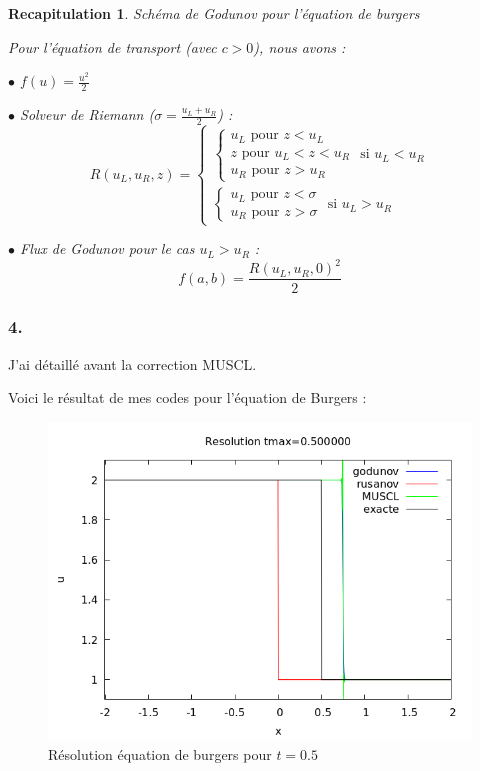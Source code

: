 \documentclass{article}
\newtheorem{recap}{Recapitulation}
\begin{document}
\begin{recap}{Schéma de Godunov pour l'équation de burgers}

Pour l'équation de transport (avec $c>0$), nous avons :

$\bullet$ $f(u) = \frac{u^2}{2}$

$\bullet$ Solveur de Riemann ($\sigma = \frac{u_L+u_R}{2}$) :
\[ R(u_L, u_R, z) = \left\{ \begin{matrix}

	\left\{ \begin{matrix}
		u_L \text{ pour } z < u_L \\
		z \text{ pour } u_L < z < u_R \\
		u_R \text{ pour } z > u_R	
	\end{matrix} \right. \text{ si } u_L < u_R \\	
	
	\left\{ \begin{matrix} 
		u_L \text{ pour } z < \sigma \\
		u_R \text{ pour } z > \sigma
	\end{matrix} \right. \text{ si } u_L > u_R

	\end{matrix} \right. \]

$\bullet$ Flux de Godunov pour le cas $u_L > u_R$ :
\[ f(a,b) = \frac{R(u_L,u_R,0)^2}{2}\]

\end{recap}

\subsubsection*{4.}

J'ai détaillé avant la correction MUSCL.
\newline


Voici le résultat de mes codes pour l'équation de Burgers :

\begin{figure}[H]
	\centering
	\includegraphics[scale=0.5]{figure/burgers_1.png}
	\caption{Résolution équation de burgers pour $t=0.5$}
\end{figure} 
\end{document}
